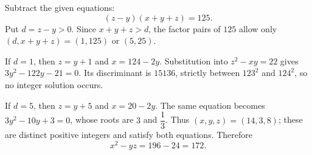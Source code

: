 Subtract the given equations:
\[
(z-y)(x+y+z)=125.
\]
Put $d=z-y>0$. Since $x+y+z>d$, the factor pairs of $125$ allow only $(d,x+y+z)=(1,125)$ or $(5,25)$.

If $d=1$, then $z=y+1$ and $x=124-2y$. Substitution into $z^2-xy=22$ gives $3y^2-122y-21=0$. Its discriminant is $15136$, strictly between $123^2$ and $124^2$, so no integer solution occurs.

If $d=5$, then $z=y+5$ and $x=20-2y$. The same equation becomes $3y^2-10y+3=0$, whose roots are $3$ and $\dfrac{1}{3}$. Thus $(x,y,z)=(14,3,8)$; these are distinct positive integers and satisfy both equations. Therefore
\[
\boxed{x^2-yz=196-24=172}.
\]
